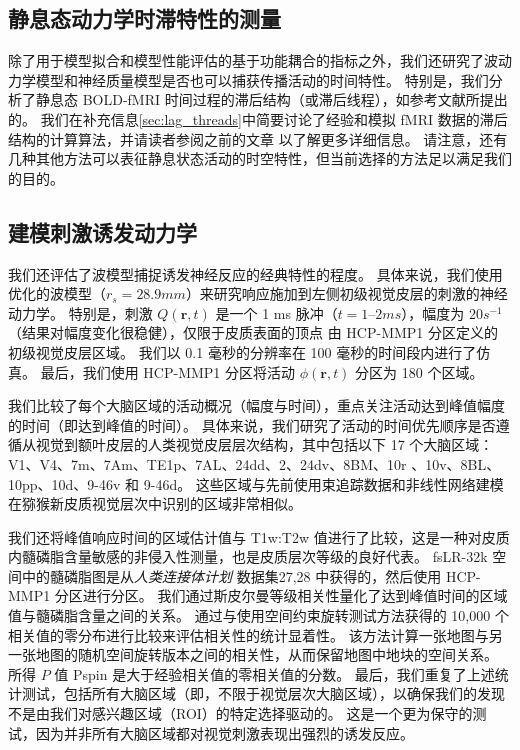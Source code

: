 \documentclass[lang=cn,a4paper,newtx]{elegantpaper}
\begin{document}
\subsection{静息态动力学时滞特性的测量} \label{sec:dynamics_measurement}

除了用于模型拟合和模型性能评估的基于功能耦合的指标之外，我们还研究了波动力学模型和神经质量模型是否也可以捕获传播活动的时间特性。
特别是，我们分析了静息态 BOLD-fMRI 时间过程的滞后结构（或滞后线程），如参考文献\cite{mitra2015lag,mitra2014lag}所提出的。
我们在补充信息\ref{sec:lag_threads}中简要讨论了经验和模拟 fMRI 数据的滞后结构的计算算法，并请读者参阅之前的文章\cite{mitra2015lag,mitra2014lag} 以了解更多详细信息。
请注意，还有几种其他方法可以表征静息状态活动的时空特性\cite{bolt2022parsimonious,cabral2017functional,kashyap2019dynamic}，但当前选择的方法足以满足我们的目的。


\subsection{建模刺激诱发动力学} \label{sec:modelling_stimulus}

我们还评估了波模型捕捉诱发神经反应的经典特性的程度。
具体来说，我们使用优化的波模型（$ r_s = 28.9 mm $）来研究响应施加到左侧初级视觉皮层的刺激的神经动力学。
特别是，刺激 $ Q(\boldsymbol{r},t) $ 是一个 1 ms 脉冲（$ t = 1–2 ms $），幅度为 $ 20 s^{-1} $（结果对幅度变化很稳健），仅限于皮质表面的顶点 由 HCP-MMP1 分区定义的 初级视觉皮层区域。
我们以 0.1 毫秒的分辨率在 100 毫秒的时间段内进行了仿真。 
最后，我们使用 HCP-MMP1 分区将活动 $ \phi(\boldsymbol{r},t) $ 分区为 180 个区域。


我们比较了每个大脑区域的活动概况（幅度与时间），重点关注活动达到峰值幅度的时间（即达到峰值的时间）。
具体来说，我们研究了活动的时间优先顺序是否遵循从视觉到额叶皮层的人类视觉皮层层次结构，其中包括以下 17 个大脑区域：V1、V4、7m、7Am、TE1p、7AL、24dd、2、24dv、8BM、10r 、10v、8BL、10pp、10d、9-46v 和 9-46d。
这些区域与先前使用束追踪数据和非线性网络建模在猕猴新皮质视觉层次中识别的区域非常相似\cite{chaudhuri2015large}。


我们还将峰值响应时间的区域估计值与 T1w:T2w 值进行了比较，这是一种对皮质内髓磷脂含量敏感的非侵入性测量\cite{glasser2011mapping}，也是皮质层次等级\cite{burt2018hierarchy}的良好代表。
fsLR-32k 空间中的髓磷脂图是从\textit{人类连接体计划} 数据集27,28 中获得的，然后使用 HCP-MMP1 分区进行分区。
我们通过斯皮尔曼等级相关性量化了达到峰值时间的区域值与髓磷脂含量之间的关系。
通过与使用空间约束旋转测试方法获得的 10,000 个相关值的零分布进行比较来评估相关性的统计显着性\cite{vavsa2018adolescent,alexander2018testing}。
该方法计算一张地图与另一张地图的随机空间旋转版本之间的相关性，从而保留地图中地块的空间关系。
所得 $ P $ 值 Pspin 是大于经验相关值的零相关值的分数。
最后，我们重复了上述统计测试，包括所有大脑区域（即，不限于视觉层次大脑区域），以确保我们的发现不是由我们对感兴趣区域（ROI）的特定选择驱动的。
这是一个更为保守的测试，因为并非所有大脑区域都对视觉刺激表现出强烈的诱发反应。
\end{document}
